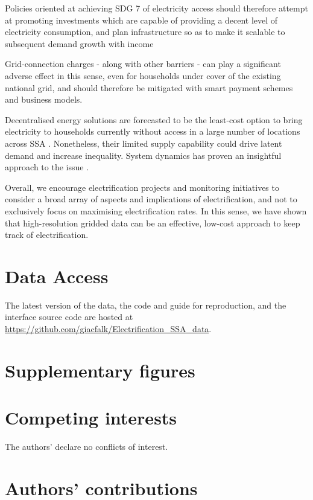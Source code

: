 \documentclass[preprint,12pt]{elsarticle}
\begin{document}
Policies oriented at achieving SDG 7 of electricity access should therefore attempt at promoting investments which are capable of providing a decent level of electricity consumption, and plan infrastructure so as to make it scalable to subsequent demand growth with income \citep{bazilian_energy_2012}

Grid-connection charges - along with other barriers \citep{lee_barriers_2014} - can play a significant adverse effect in this sense, even for households under cover of the existing national grid, and should therefore be mitigated with smart payment schemes \citep{golumbeanu_connection_2013} and business models. 

Decentralised energy solutions are forecasted to be the least-cost option to bring electricity to households currently without access in a large number of locations across SSA \citep{dagnachew_role_2017}. Nonetheless, their limited supply capability could drive latent demand and increase inequality. System dynamics has proven an insightful approach to the issue \citep{riva_merry-go-round_2018}. 

Overall, we encourage electrification projects and monitoring initiatives to consider a broad array of aspects and implications of electrification, and not to exclusively focus on maximising electrification rates. In this sense, we have shown that high-resolution gridded data can be an effective, low-cost approach to keep track of electrification. 

\section*{Data Access}
The latest version of the data, the code and guide for reproduction, and the interface source code are hosted at \url{https://github.com/giacfalk/Electrification_SSA_data}.

\section*{Supplementary figures}
\renewcommand{\thefigure}{A.\arabic{figure}}
\setcounter{figure}{0}


\section*{Competing interests}
The authors' declare no conflicts of interest. 

\section*{Authors' contributions}
\end{document}
